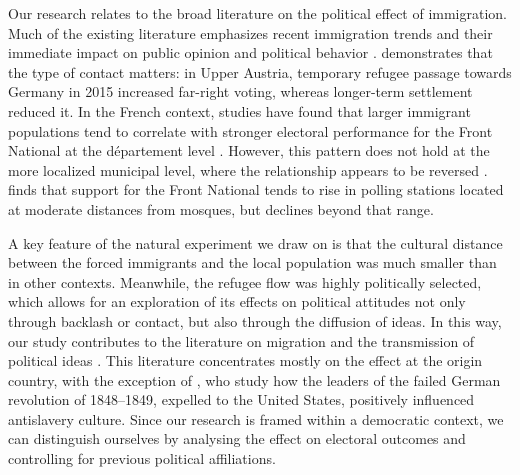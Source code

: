 Our research relates to the broad literature on the political effect of immigration. Much of the existing literature emphasizes recent immigration trends and their immediate impact on public opinion and political behavior \citep{halla_immigration_2017, dustmann_refugee_2018, steinhardt_xenophobic_2018}. \citet{steinmayr_contact_2021} demonstrates that the type of contact matters: in Upper Austria, temporary refugee passage towards Germany in 2015 increased far-right voting, whereas longer-term settlement reduced it. In the French context, studies have found that larger immigrant populations tend to correlate with stronger electoral performance for the Front National at the département level \citep{edo_immigration_2019}. However, this pattern does not hold at the more localized municipal level, where the relationship appears to be reversed \citep{della2013competitive, vasilopoulos2022residential, vertier_dismantling_2023}. \citet{dazey_mosque_2024} finds that support for the Front National tends to rise in polling stations located at moderate distances from mosques, but declines beyond that range. 

A key feature of the natural experiment we draw on is that the cultural distance between the forced immigrants and the local population was much smaller than in other contexts. Meanwhile, the refugee flow was highly politically selected, which allows for an exploration of its effects on political attitudes not only through backlash or contact, but also through the diffusion of ideas. In this way, our study contributes to the literature on migration and the transmission of political ideas \citep{spilimbergo_democracy_2009, barsbai_effect_2017, dippel_leadership_2021, calderon_racial_2023, bazzi_confederate_2023}. This literature concentrates mostly on the effect at the origin country, with the exception of \citet{dippel_leadership_2021}, who study how the leaders of the failed German revolution of 1848–1849, expelled to the United States, positively influenced antislavery culture. Since our research is framed within a democratic context, we can distinguish ourselves by analysing the effect on electoral outcomes and controlling for previous political affiliations. 

